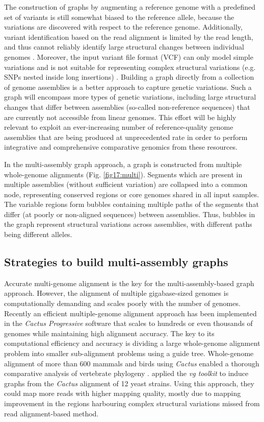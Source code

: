 \documentclass[../main.tex]{subfiles}
\begin{document}
The construction of graphs by augmenting a reference genome with a predefined set of variants is still somewhat biased to the reference allele, because the variations are discovered with respect to the reference genome. Additionally, variant identification based on the read alignment is limited by the read length, and thus cannot reliably identify large structural changes between individual genomes \citep{feng2020higher}. Moreover, the input variant file format (VCF) can only model simple variations and is not suitable for representing complex structural variations (e.g. SNPs nested inside long insertions) \citep{letcher2021enabling}.  Building a graph directly from a collection of genome assemblies is a better approach to capture  genetic variations. Such a graph will encompass more types of genetic variations, including large structural changes that differ between assemblies (so-called non-reference sequences) that are currently not accessible from linear genomes. This effort will be highly relevant to exploit an ever-increasing number of reference-quality genome assemblies that are being produced at unprecedented rate in order to perform integrative and comprehensive comparative genomics from these resources. 

In the multi-assembly graph approach, a graph is constructed from  multiple whole-genome alignments (Fig. \ref{fig17:multi}). Segments which are present in multiple assemblies (without sufficient variation) are collapsed into a common node, representing conserved regions or core genomes shared in all input samples. The variable regions form bubbles containing multiple paths of the segments that differ (at poorly or non-aligned sequences) between assemblies. Thus, bubbles in the graph represent structural variations across assemblies, with different paths being different alleles. 

\subsection*{Strategies to build multi-assembly graphs}

Accurate multi-genome alignment is the key for the multi-assembly-based graph approach. However, the alignment of multiple gigabase-sized genomes is computationally demanding and scales poorly with the number of genomes. Recently an efficient multiple-genome alignment approach has been implemented in the \emph{Cactus Progressive} software \citep{armstrong2020progressive} that scales to hundreds or even  thousands of genomes while maintaining high alignment accuracy. The key to its computational efficiency and accuracy is dividing a large whole-genome alignment problem into smaller sub-alignment problems using a guide tree. Whole-genome alignment of more than 600 mammals and birds using \emph{Cactus} enabled a thorough comparative analysis of vertebrate phylogeny \citep{feng2020dense}.
\citet{hickey2020genotyping} applied the \emph{vg toolkit} to induce graphs from the \emph{Cactus} alignment of 12 yeast strains. Using this approach, they could map more reads with higher mapping quality, mostly due to mapping improvement in the regions harbouring complex structural variations missed from read alignment-based method. 
\end{document}
